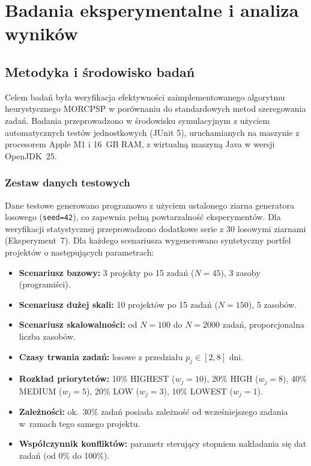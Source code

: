 \chapter{Badania eksperymentalne i analiza wyników}

\section{Metodyka i środowisko badań}
Celem badań była weryfikacja efektywności zaimplementowanego algorytmu heurystycznego MORCPSP w porównaniu do standardowych metod szeregowania zadań. Badania przeprowadzono w środowisku symulacyjnym z użyciem automatycznych testów jednostkowych (JUnit 5), uruchamianych na maszynie z procesorem Apple M1 i 16~GB RAM, z wirtualną maszyną Java w wersji OpenJDK~25.

\subsection{Zestaw danych testowych}
Dane testowe generowano programowo z użyciem ustalonego ziarna generatora losowego (\texttt{seed=42}), co zapewnia pełną powtarzalność eksperymentów. Dla weryfikacji statystycznej przeprowadzono dodatkowe serie z 30 losowymi ziarnami (Eksperyment~7). Dla każdego scenariusza wygenerowano syntetyczny portfel projektów o następujących parametrach:
\begin{itemize}
    \item \textbf{Scenariusz bazowy:} 3 projekty po 15 zadań ($N=45$), 3 zasoby (programiści).
    \item \textbf{Scenariusz dużej skali:} 10 projektów po 15 zadań ($N=150$), 5 zasobów.
    \item \textbf{Scenariusz skalowalności:} od $N=100$ do $N=2000$ zadań, proporcjonalna liczba zasobów.
    \item \textbf{Czasy trwania zadań:} losowe z przedziału $p_j \in [2, 8]$ dni.
    \item \textbf{Rozkład priorytetów:} 10\% HIGHEST ($w_j=10$), 20\% HIGH ($w_j=8$), 40\% MEDIUM ($w_j=5$), 20\% LOW ($w_j=3$), 10\% LOWEST ($w_j=1$).
    \item \textbf{Zależności:} ok.~30\% zadań posiada zależność od wcześniejszego zadania w~ramach tego samego projektu.
    \item \textbf{Współczynnik konfliktów:} parametr sterujący stopniem nakładania się dat zadań (od 0\% do 100\%).
\end{itemize}

